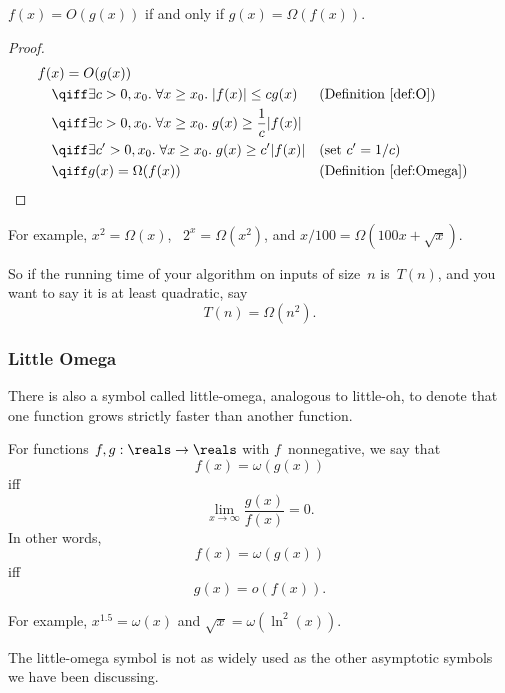 \begin{theorem}\label{thm:9S2}
$f(x) = O(g(x))$ if and only if $g(x) = \Omega(f(x))$.
\end{theorem}

\begin{proof}
\begin{align*}
\lefteqn{f(x) = O(g(x))} \quad &\\
   & \qiff \exists c > 0, x_0. \; \forall x \ge x_0. \;
            |f(x)| \le c g(x) 
        && \text{(Definition~\ref{def:O})} \\
    & \qiff \exists c > 0, x_0. \; \forall x \ge x_0. \;
            g(x) \ge \frac{1}{c} |f(x)| \\
    & \qiff \exists c' > 0, x_0. \; \forall x \ge x_0. \;
            g(x) \ge c' |f(x)|
        && \text{(set $c' = 1/c$)} \\
    & \qiff g(x) = \Omega(f(x))
        && \text{(Definition~\ref{def:Omega})}
\qedhere
\end{align*}
\end{proof}

For example, $x^2 = \Omega(x)$, \ $2^x = \Omega(x^2)$, and $x/100 =
\Omega(100 x + \sqrt{x})$.

So if the running time of your algorithm on inputs of size~$n$
is~$T(n)$, and you want to say it is at least quadratic, say
\[
    T(n) = \Omega(n^2).
\]

\subsubsection{Little Omega}
                                   
There is also a symbol called little-omega, analogous to little-oh, to
denote that one function grows strictly faster than another function.

\begin{definition}\label{def:omega}
For functions $f, g: \reals \to \reals$ with $f$~nonnegative, we say
that
\[
    f(x) = \omega(g(x))
\]
iff
\[
    \lim_{x \to \infty} \frac{g(x)}{f(x)} = 0.
\]
In other words,
\[
    f(x) = \omega(g(x))
\]
iff
\[
    g(x) = o(f(x)).
\]
\end{definition}

For example, $x^{1.5} = \omega(x)$ and $\sqrt{x} = \omega(\ln^2(x))$.

The little-omega symbol is not as widely used as the other asymptotic
symbols we have been discussing.
\fi


